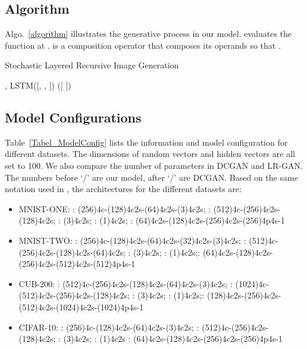 \documentclass{article} \usepackage{iclr2017_conference,times}
\newcommand*\Let[2]{\State #1  #2}
\begin{document}
\subsection{Algorithm}
\label{Appendix_Alg}
Algo.~\ref{algorithm} illustrates the generative process in our model.  evaluates the function  at .   is a composition operator that composes its operands so that . 

\begin{algorithm}
\caption{Stochastic Layered Recursive Image Generation}
\begin{algorithmic}[1]
\State 
\State   {} 
\Let{}{}
\Let{}{}
\For  { }
\State 
\Let{, }{LSTM([, , ])}  
   \Let{}{}
  \Else
    \Let{}{([  ])} 
 \EndIf
   \Let{}{ } 
           \Let{}{} 
     \Let{}{ } 
        \Let{}{ } 
        \Let{ }{ } 
        \Let{}{}
\EndFor
\end{algorithmic}
\label{algorithm}
\end{algorithm}

\subsection{Model Configurations}
\label{Appendix_ModelConfig}
Table~\ref{Tabel_ModelConfig} lists the information and model configuration for different datasets. The dimensions of random vectors and hidden vectors are all set to 100. We also compare the number of parameters in DCGAN and LR-GAN. The numbers before `/' are our model, after `/' are DCGAN. Based on the same notation used in \citep{EBGAN}, the architectures for the different datasets are:
\begin{itemize}
\item MNIST-ONE: : (256)4c-(128)4c2s-(64)4c2s-(3)4c2s; : (512)4c-(256)4c2s-(128)4c2s; :  (3)4c2s; : (1)4c2s; : (64)4c2s-(128)4c2s-(256)4c2s-(256)4p4s-1

\item MNIST-TWO: : (256)4c-(128)4c2s-(64)4c2s-(32)4c2s-(3)4c2s; : (512)4c-(256)4c2s-(128)4c2s-(64)4c2s; :  (3)4c2s; : (1)4c2s;: (64)4c2s-(128)4c2s-(256)4c2s-(512)4c2s-(512)4p4s-1

\item CUB-200: : (512)4c-(256)4c2s-(128)4c2s-(64)4c2s-(3)4c2s; : (1024)4c-(512)4c2s-(256)4c2s-(128)4c2s; :  (3)4c2s; : (1)4c2s;: (128)4c2s-(256)4c2s-(512)4c2s-(1024)4c2s-(1024)4p4s-1

\item CIFAR-10: : (256)4c-(128)4c2s-(64)4c2s-(3)4c2s; : (512)4c-(256)4c2s-(128)4c2s; :  (3)4c2s; : (1)4c2s : (64)4c2s-(128)4c2s-(256)4c2s-(256)4p4s-1
\end{itemize} 
\end{document}
